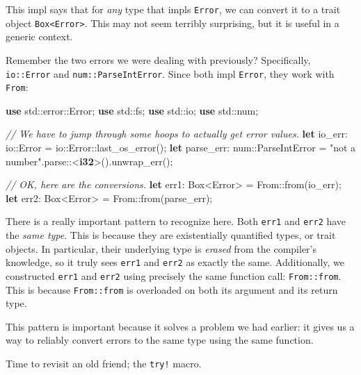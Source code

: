 \documentclass[a4paper,]{book}
\newenvironment{Shaded}{\begin{snugshade}}{\end{snugshade}}
\newcommand{\KeywordTok}[1]{\textcolor[rgb]{0.13,0.29,0.53}{\textbf{{#1}}}}
\newcommand{\StringTok}[1]{\textcolor[rgb]{0.31,0.60,0.02}{{#1}}}
\newcommand{\CommentTok}[1]{\textcolor[rgb]{0.56,0.35,0.01}{\textit{{#1}}}}
\newcommand{\NormalTok}[1]{{#1}}
\begin{document}
This impl says that for \emph{any} type that impls \texttt{Error}, we
can convert it to a trait object
\texttt{Box\textless{}Error\textgreater{}}. This may not seem terribly
surprising, but it is useful in a generic context.

Remember the two errors we were dealing with previously? Specifically,
\texttt{io::Error} and \texttt{num::ParseIntError}. Since both impl
\texttt{Error}, they work with \texttt{From}:

\begin{Shaded}
\begin{Highlighting}[]
\KeywordTok{use} \NormalTok{std::error::Error;}
\KeywordTok{use} \NormalTok{std::fs;}
\KeywordTok{use} \NormalTok{std::io;}
\KeywordTok{use} \NormalTok{std::num;}

\CommentTok{// We have to jump through some hoops to actually get error values.}
\KeywordTok{let} \NormalTok{io_err: io::Error = io::Error::last_os_error();}
\KeywordTok{let} \NormalTok{parse_err: num::ParseIntError = }\StringTok{"not a number"}\NormalTok{.parse::<}\KeywordTok{i32}\NormalTok{>().unwrap_err();}

\CommentTok{// OK, here are the conversions.}
\KeywordTok{let} \NormalTok{err1: Box<Error> = From::from(io_err);}
\KeywordTok{let} \NormalTok{err2: Box<Error> = From::from(parse_err);}
\end{Highlighting}
\end{Shaded}

There is a really important pattern to recognize here. Both
\texttt{err1} and \texttt{err2} have the \emph{same type}. This is
because they are existentially quantified types, or trait objects. In
particular, their underlying type is \emph{erased} from the compiler's
knowledge, so it truly sees \texttt{err1} and \texttt{err2} as exactly
the same. Additionally, we constructed \texttt{err1} and \texttt{err2}
using precisely the same function call: \texttt{From::from}. This is
because \texttt{From::from} is overloaded on both its argument and its
return type.

This pattern is important because it solves a problem we had earlier: it
gives us a way to reliably convert errors to the same type using the
same function.

Time to revisit an old friend; the \texttt{try!} macro.

\end{document}

